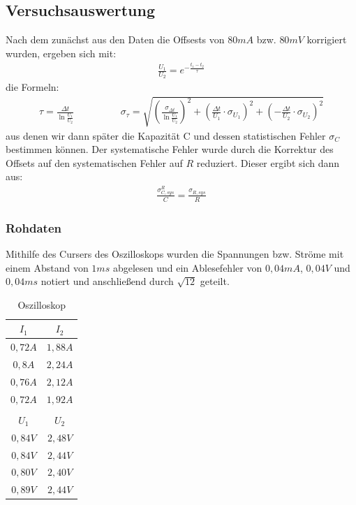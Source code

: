 \documentclass[12pt,a4paper]{article}
\begin{document}
\subsection{Versuchsauswertung}
Nach dem zunächst aus den Daten die Offsests von $80mA$ bzw. $80mV$ korrigiert wurden, ergeben sich mit:
\begin{align*}
\frac{U_1}{U_2}=e^{-\frac{t_1-t_2}{\tau}}
\end{align*}
die Formeln:
\begin{align*}
\tau=\frac{\Delta t}{\ln{\frac{U_1}{U_2}}} \hspace{2cm}
\sigma_{\tau}=\sqrt{(\frac{\sigma_{\Delta t}}{\ln{\frac{U_1}{U_2}}})^2+(\frac{\Delta t}{U_1} \cdot \sigma_{U_1})^2+(-\frac{\Delta t}{U_2} \cdot \sigma_{U_2})^2}
\end{align*}
aus denen wir dann später die Kapazität C und dessen statistischen Fehler $\sigma_C$ bestimmen können.
Der systematische Fehler wurde durch die Korrektur des Offsets auf den systematischen Fehler auf $R$ reduziert. Dieser ergibt sich dann aus:
\begin{align*}
\frac{\sigma_{C,sys}^R}{C}=\frac{\sigma_{R,sys}}{R}
\end{align*}
\subsubsection{Rohdaten}
Mithilfe des Cursers des Oszilloskops wurden die Spannungen bzw. Ströme mit einem Abstand von $1ms$ abgelesen und ein Ablesefehler von $0,04mA$, $0,04V$ und $0,04ms$ notiert und anschließend durch $\sqrt{12}$ geteilt.
\begin{table}[H]\centering
\caption{Oszilloskop}
\begin{tabular}{c|c}
$I_1$& $I_2$\\ \hline
$0,72A$& $1,88A$\\ 
$0,8A$& $2,24A$ \\
$0,76A$& $2,12A$ \\
$0,72A$& $1,92A$ \\
\\
$U_1$& $U_2$ \\ \hline
$0,84V$& $2,48V$ \\
$0,84V$& $2,44V$ \\
$0,80V$& $2,40V$ \\
$0,89V$& $2,44V$ \\
\end{tabular} 
\end{table}
\end{document}
